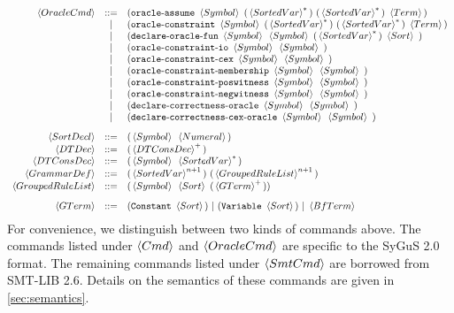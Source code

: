 \documentclass[english,a4paper,10pt]{article}
\begin{document}
\[\begin{array}{rcl}
\oraclecmd 
& ::= & \paren{\assumeoraclekwd\mbox{ }\symbol\mbox{ } \paren{\kstar{\sortedvar}}\mbox{ }\paren{\kstar{\sortedvar}}\mbox{ }
 \term} \\
 & | & \paren{\constraintoraclekwd\mbox{ }\symbol\mbox{ } \paren{\kstar{\sortedvar}}\mbox{ }\paren{\kstar{\sortedvar}}\mbox{ }
 \term} \\
& | & \paren{\oracledeckwd\mbox{ }\symbol\mbox{ }\symbol\mbox{ }\paren{\kstar{\sortedvar}}\mbox{ }\sortexpr\mbox{ }} \\
& | &\paren{\iooracledeckwd\mbox{ }\symbol\mbox{ } \symbol\mbox{ }} \\
& | &\paren{\cexoracledeckwd\mbox{ }\symbol\mbox{ } \symbol\mbox{ }} \\
& | &\paren{\memoracledeckwd\mbox{ }\symbol\mbox{ } \symbol\mbox{ }} \\
& | &\paren{\poswitnessoracledeckwd\mbox{ }\symbol\mbox{ } \symbol\mbox{ }} \\
& | &\paren{\negwitnessoracledeckwd\mbox{ }\symbol\mbox{ } \symbol\mbox{ }} \\
& | &\paren{\corroracledeckwd\mbox{ }\symbol\mbox{ } \symbol\mbox{ }} \\
& | &\paren{\corrcexoracledeckwd\mbox{ }\symbol\mbox{ } \symbol\mbox{ }} \\[2ex]



 \sortdecl & ::= & \paren{\symbol\mbox{ }\intconst}\\
 \dtdec & ::= & \paren{\kplus{\dtconsdec}} \\
 \dtconsdec & ::= & \paren{\symbol\mbox{ }\kstar{\sortedvar}} \\
 \grammardef & ::= & \paren{\kstarn{\sortedvar}{n+1}}\mbox{ }\paren{\kstarn{\ntdef}{n+1}} \\
 \ntdef & ::= & \paren{\symbol\mbox{ }\sortexpr\mbox{ }\paren{ \kplus{\gterm} } } \\[2ex]
 \gterm 
 & ::= &  \paren{\constantkwd\mbox{ }\sortexpr}\mbox{ }|\mbox{ }\paren{\varkwd\mbox{ }\sortexpr}\mbox{ }|\mbox{ }\bfterm\\
\end{array}
\]
For convenience,
we distinguish between two kinds of commands above.
The commands listed under $\cmd$ and $\oraclecmd$ are specific to the SyGuS 2.0 format.
The remaining commands listed under $\smtcmd$
are borrowed from SMT-LIB 2.6.
Details on the semantics of these commands are given in \cref{sec:semantics}.
\end{document}
